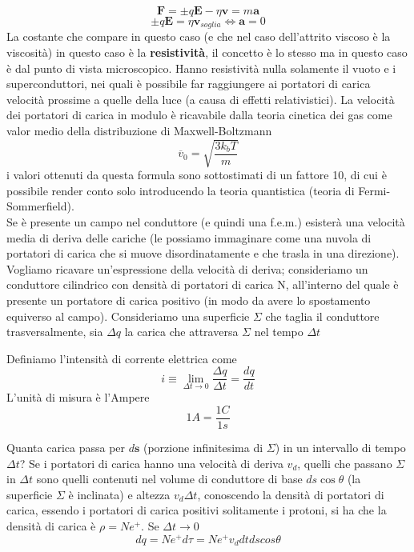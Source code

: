 \documentclass[
10pt, %
a4paper, %
oneside, %
headinclude,footinclude, %
BCOR5mm, %
]{scrartcl}
\begin{document}
\[\mathbf{F} = \pm q\mathbf{E}-\eta\mathbf{v}=m\mathbf{a}\]
\[\pm q\mathbf{E}=\eta\mathbf{v}_{soglia} \Leftrightarrow \mathbf{a}= 0\]
La costante che compare in questo caso (e che nel caso dell'attrito viscoso è la viscosità) in questo caso è la \textbf{resistività}, il concetto è lo stesso ma in questo caso è dal punto di vista microscopico. Hanno resistività nulla solamente il vuoto e i superconduttori, nei quali è possibile far raggiungere ai portatori di carica velocità prossime a quelle della luce (a causa di effetti relativistici). La velocità dei portatori di carica in modulo è ricavabile dalla teoria cinetica dei gas come valor medio della distribuzione di Maxwell-Boltzmann
\[\overline{v}_0=\sqrt{\frac{3k_b T}{m}}\]
i valori ottenuti da questa formula sono sottostimati di un fattore 10, di cui è possibile render conto solo introducendo la teoria quantistica (teoria di Fermi-Sommerfield).\\
Se è presente un campo nel conduttore (e quindi una f.e.m.) esisterà una velocità media di deriva delle cariche (le possiamo immaginare come una nuvola di portatori di carica che si muove disordinatamente e che trasla in una direzione). Vogliamo ricavare un'espressione della velocità di deriva; consideriamo un conduttore cilindrico con densità di portatori di carica N, all'interno del quale è presente un portatore di carica positivo (in modo da avere lo spostamento equiverso al campo). Consideriamo una superficie \(\Sigma\) che taglia il conduttore trasversalmente, sia $\Delta q$ la carica che attraversa $\Sigma$ nel tempo $\Delta t$
\begin{definizione}
	Definiamo l'intensità di corrente elettrica come
	\[i \equiv \lim_{\Delta t \to 0} \frac{\Delta q}{\Delta t}=\frac{dq}{dt}\]
	L'unità di misura è l'Ampere
	\[1 A = \frac{1 C}{1 s}\]
\end{definizione}
Quanta carica passa per \(d\mathbf{s}\) (porzione infinitesima di $\Sigma$) in un intervallo di tempo $\Delta t$? Se i portatori di carica hanno una velocità di deriva \(v_d\), quelli che passano $\Sigma$ in $\Delta t$ sono quelli contenuti nel volume di conduttore di base \(ds\cos\theta\) (la superficie $\Sigma$ è inclinata) e altezza $v_d\Delta t$, conoscendo la densità di portatori di carica, essendo i portatori di carica positivi solitamente i protoni, si ha che la densità di carica è \(\rho = N e^+\). Se $\Delta t \to 0$
\[dq = N e^+ d\tau = N e^+ v_d dt ds cos\theta\]
\end{document}
